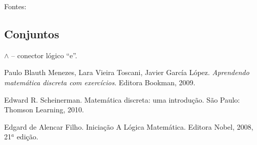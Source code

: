 

Fontes: \cite{set:ed2010,set:blauth2010,set:edgard2008}

\subsection{Conjuntos}


\noindent $\land$ -- conector lógico ``e''.\\


\begin{thebibliography}{1}
 Paulo Blauth Menezes, Lara Vieira
Toscani, Javier García López. \emph{Aprendendo matemática discreta com
exercícios}. Editora Bookman, 2009.

 Edward R. Scheinerman. Matemática
  discreta: uma introdução. São Paulo: Thomson Learning, 2010.

 Edgard de Alencar Filho.
  {Inicia\c{c}\~ao A L\'ogica Matem\'atica}. Editora Nobel, 2008,
  21$^a$ edi\c{c}\~ao.

\end{thebibliography}



